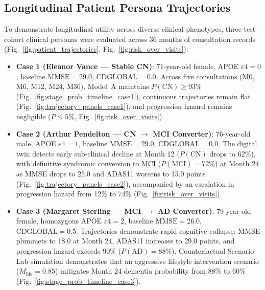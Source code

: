 \documentclass[11pt,a4paper]{article}
\begin{document}
\subsection{Longitudinal Patient Persona Trajectories}
\label{sec:results_personas}
To demonstrate longitudinal utility across diverse clinical phenotypes, three test-cohort clinical personas were evaluated across 36 months of consultation records (Fig.~\ref{fig:patient_trajectories}, Fig.~\ref{fig:risk_over_visits}):
\begin{itemize}
    \item \textbf{Case 1 (Eleanor Vance — Stable CN)}: 71-year-old female, APOE $\varepsilon4 = 0$, baseline $\text{MMSE} = 29.0$, $\text{CDGLOBAL} = 0.0$. Across five consultations (M0, M6, M12, M24, M36), Model~A maintains $P(\text{CN}) \ge 93\%$ (Fig.~\ref{fig:stage_prob_timeline_case1}), continuous trajectories remain flat (Fig.~\ref{fig:trajectory_panels_case1}), and progression hazard remains negligible ($P \le 5\%$, Fig.~\ref{fig:risk_over_visits}).
    \item \textbf{Case 2 (Arthur Pendelton — CN $\to$ MCI Converter)}: 76-year-old male, APOE $\varepsilon4 = 1$, baseline $\text{MMSE} = 29.0$, $\text{CDGLOBAL} = 0.0$. The digital twin detects early sub-clinical decline at Month 12 ($P(\text{CN})$ drops to 62\%), with definitive syndromic conversion to MCI ($P(\text{MCI}) = 72\%$) at Month 24 as MMSE drops to 25.0 and ADAS11 worsens to 15.0 points (Fig.~\ref{fig:trajectory_panels_case2}), accompanied by an escalation in progression hazard from 12\% to 74\% (Fig.~\ref{fig:risk_over_visits}).
    \item \textbf{Case 3 (Margaret Sterling — MCI $\to$ AD Converter)}: 79-year-old female, homozygous APOE $\varepsilon4 = 2$, baseline $\text{MMSE} = 26.0$, $\text{CDGLOBAL} = 0.5$. Trajectories demonstrate rapid cognitive collapse: MMSE plummets to 18.0 at Month 24, ADAS11 increases to 29.0 points, and progression hazard exceeds 90\% ($P(\text{AD}) = 88\%$). Counterfactual Scenario Lab simulation demonstrates that an aggressive lifestyle intervention scenario ($M_{\text{life}} = 0.85$) mitigates Month 24 dementia probability from 88\% to 60\% (Fig.~\ref{fig:stage_prob_timeline_case3}).
\end{itemize}
\end{document}
